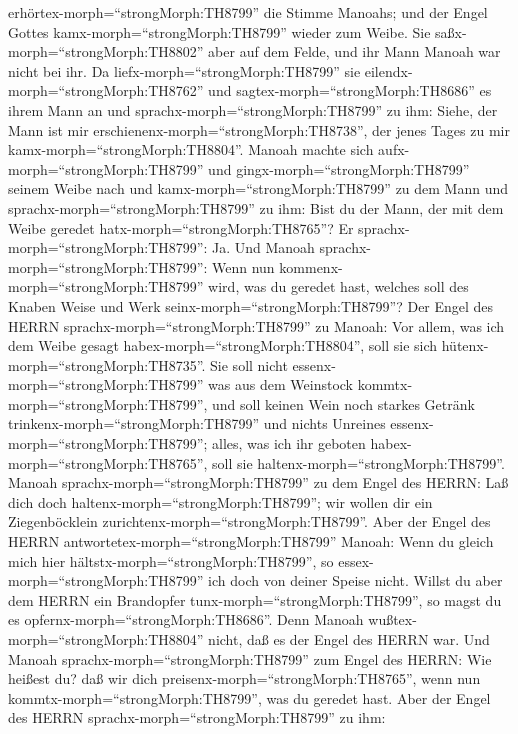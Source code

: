 erhörtex-morph=``strongMorph:TH8799'' die Stimme Manoahs; und der Engel
Gottes kamx-morph=``strongMorph:TH8799'' wieder zum Weibe. Sie
saßx-morph=``strongMorph:TH8802'' aber auf dem Felde, und ihr Mann
Manoah war nicht bei ihr.  Da
liefx-morph=``strongMorph:TH8799'' sie
eilendx-morph=``strongMorph:TH8762'' und
sagtex-morph=``strongMorph:TH8686'' es ihrem Mann an und
sprachx-morph=``strongMorph:TH8799'' zu ihm: Siehe, der Mann ist mir
erschienenx-morph=``strongMorph:TH8738'', der jenes Tages zu mir
kamx-morph=``strongMorph:TH8804''.  Manoah machte sich
aufx-morph=``strongMorph:TH8799'' und gingx-morph=``strongMorph:TH8799''
seinem Weibe nach und kamx-morph=``strongMorph:TH8799'' zu dem Mann und
sprachx-morph=``strongMorph:TH8799'' zu ihm: Bist du der Mann, der mit
dem Weibe geredet hatx-morph=``strongMorph:TH8765''? Er
sprachx-morph=``strongMorph:TH8799'': Ja.  Und Manoah
sprachx-morph=``strongMorph:TH8799'': Wenn nun
kommenx-morph=``strongMorph:TH8799'' wird, was du geredet hast, welches
soll des Knaben Weise und Werk seinx-morph=``strongMorph:TH8799''?
 Der Engel des HERRN sprachx-morph=``strongMorph:TH8799''
zu Manoah: Vor allem, was ich dem Weibe gesagt
habex-morph=``strongMorph:TH8804'', soll sie sich
hütenx-morph=``strongMorph:TH8735''.  Sie soll nicht
essenx-morph=``strongMorph:TH8799'' was aus dem Weinstock
kommtx-morph=``strongMorph:TH8799'', und soll keinen Wein noch starkes
Getränk trinkenx-morph=``strongMorph:TH8799'' und nichts Unreines
essenx-morph=``strongMorph:TH8799''; alles, was ich ihr geboten
habex-morph=``strongMorph:TH8765'', soll sie
haltenx-morph=``strongMorph:TH8799''.  Manoah
sprachx-morph=``strongMorph:TH8799'' zu dem Engel des HERRN: Laß dich
doch haltenx-morph=``strongMorph:TH8799''; wir wollen dir ein
Ziegenböcklein zurichtenx-morph=``strongMorph:TH8799''. 
Aber der Engel des HERRN antwortetex-morph=``strongMorph:TH8799''
Manoah: Wenn du gleich mich hier hältstx-morph=``strongMorph:TH8799'',
so essex-morph=``strongMorph:TH8799'' ich doch von deiner Speise nicht.
Willst du aber dem HERRN ein Brandopfer
tunx-morph=``strongMorph:TH8799'', so magst du es
opfernx-morph=``strongMorph:TH8686''. Denn Manoah
wußtex-morph=``strongMorph:TH8804'' nicht, daß es der Engel des HERRN
war.  Und Manoah sprachx-morph=``strongMorph:TH8799'' zum
Engel des HERRN: Wie heißest du? daß wir dich
preisenx-morph=``strongMorph:TH8765'', wenn nun
kommtx-morph=``strongMorph:TH8799'', was du geredet hast. 
Aber der Engel des HERRN sprachx-morph=``strongMorph:TH8799'' zu ihm:
